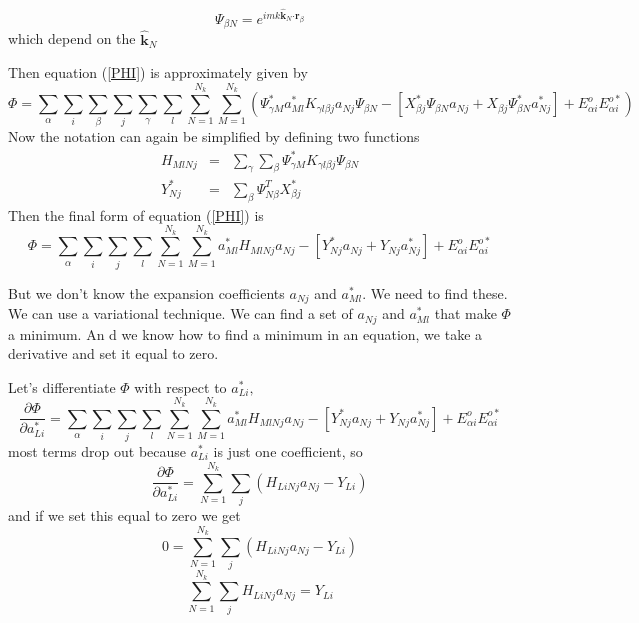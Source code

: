 \documentclass{article}
\begin{document}
\begin{equation}
\Psi _{\beta N}=e^{imk\mathbf{\hat{k}}_{N}\mathbf{\cdot r}_{\beta }}
\end{equation}%
which depend on the $\mathbf{\hat{k}}_{N}$

Then equation (\ref{PHI}) is approximately given by 
\begin{equation}
\Phi =\sum_{\alpha }\sum_{i}\sum_{\beta }\sum_{j}\sum_{\gamma
}\sum_{l}\sum_{N=1}^{N_{k}}\sum_{M=1}^{N_{k}}\left( \Psi _{\gamma M}^{\ast
}a_{Ml}^{\ast }K_{\gamma l\beta j}a_{Nj}\Psi _{\beta N}-\left[ X_{\beta
j}^{\ast }\Psi _{\beta N}a_{Nj}+X_{\beta j}\Psi _{\beta N}^{\ast
}a_{Nj}^{\ast }\right] +E_{\alpha i}^{o}E_{\alpha i}^{o\ast }\right)
\end{equation}%
Now the notation can again be simplified by defining two functions 
\begin{eqnarray}
H_{MlNj} &=&\sum_{\gamma }\sum_{\beta }\Psi _{\gamma M}^{\ast }K_{\gamma
l\beta j}\Psi _{\beta N} \\
Y_{Nj}^{\ast } &=&\sum_{\beta }\Psi _{N\beta }^{T}X_{\beta j}^{\ast }
\end{eqnarray}%
Then the final form of equation (\ref{PHI}) is 
\begin{equation}
\Phi =\sum_{\alpha
}\sum_{i}\sum_{j}\sum_{l}\sum_{N=1}^{N_{k}}\sum_{M=1}^{N_{k}}a_{Ml}^{\ast
}H_{MlNj}a_{Nj}-\left[ Y_{Nj}^{\ast }a_{Nj}+Y_{Nj}a_{Nj}^{\ast }\right]
+E_{\alpha i}^{o}E_{\alpha i}^{o\ast }  \label{PhiSimp}
\end{equation}

But we don't know the expansion coefficients $a_{Nj}$ and $a_{Ml}^{\ast }.$
We need to find these. We can use a variational technique. We can find a set
of $a_{Nj}$ and $a_{Ml}^{\ast }$ that make $\Phi $ a minimum. An d we know
how to find a minimum in an equation, we take a derivative and set it equal
to zero.

Let's differentiate $\Phi $ with respect to $a_{Li}^{\ast },$%
\begin{equation*}
\frac{\partial \Phi }{\partial a_{Li}^{\ast }}=\sum_{\alpha
}\sum_{i}\sum_{j}\sum_{l}\sum_{N=1}^{N_{k}}\sum_{M=1}^{N_{k}}a_{Ml}^{\ast
}H_{MlNj}a_{Nj}-\left[ Y_{Nj}^{\ast }a_{Nj}+Y_{Nj}a_{Nj}^{\ast }\right]
+E_{\alpha i}^{o}E_{\alpha i}^{o\ast }
\end{equation*}%
most terms drop out because $a_{Li}^{\ast }$ is just one coefficient, so 
\begin{equation}
\frac{\partial \Phi }{\partial a_{Li}^{\ast }}=\sum_{N=1}^{N_{k}}\sum_{j}%
\left( H_{LiNj}a_{Nj}-Y_{Li}\right)  \label{DerPhi}
\end{equation}%
and if we set this equal to zero we get%
\begin{equation}
0=\sum_{N=1}^{N_{k}}\sum_{j}\left( H_{LiNj}a_{Nj}-Y_{Li}\right)
\end{equation}%
\begin{equation}
\sum_{N=1}^{N_{k}}\sum_{j}H_{LiNj}a_{Nj}=Y_{Li}
\end{equation}
\end{document}
